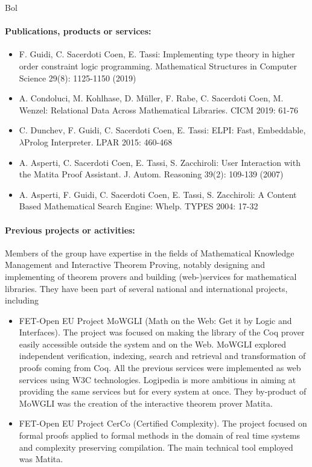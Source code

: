 \begin{sitedescription}{Bol}
\paragraph{Publications, products or services:}
\begin{itemize}
\item F. Guidi, C. Sacerdoti Coen, E. Tassi:
Implementing type theory in higher order constraint logic programming. Mathematical Structures in Computer Science 29(8): 1125-1150 (2019)
\item A. Condoluci, M. Kohlhase, D. Müller, F. Rabe, C. Sacerdoti Coen, M. Wenzel: Relational Data Across Mathematical Libraries. CICM 2019: 61-76
\item C. Dunchev, F. Guidi, C. Sacerdoti Coen, E. Tassi:
ELPI: Fast, Embeddable, $\lambda$Prolog Interpreter. LPAR 2015: 460-468
\item A. Asperti, C. Sacerdoti Coen, E. Tassi, S. Zacchiroli:
User Interaction with the Matita Proof Assistant. J. Autom. Reasoning 39(2): 109-139 (2007)
\item A. Asperti, F. Guidi, C. Sacerdoti Coen, E. Tassi, S. Zacchiroli:
A Content Based Mathematical Search Engine: Whelp. TYPES 2004: 17-32
\end{itemize}

\paragraph{Previous projects or activities:}
Members of the group have expertise in the fields of Mathematical Knowledge Management and Interactive Theorem Proving, notably designing and implementing of theorem provers and building (web-)services for mathematical libraries.
They have been part of several national and international projects, including
\begin{itemize}
\item FET-Open EU Project MoWGLI (Math on the Web: Get it by Logic and Interfaces). The project was focused on making the library of the Coq prover easily accessible outside the system and on the Web. MoWGLI explored independent verification, indexing, search and retrieval and transformation of proofs coming from Coq. All the previous services were implemented as web services using W3C technologies. Logipedia is more ambitious in aiming at providing the same services but for every system at once. They by-product of MoWGLI was the creation of the interactive theorem prover Matita.

\item FET-Open EU Project CerCo (Certified Complexity). The project focused on formal proofs applied to formal methods in the domain of real time systems and complexity preserving compilation. The main technical tool employed was Matita.


\end{itemize}
\end{sitedescription}
